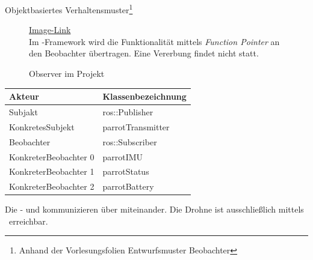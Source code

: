 
Objektbasiertes Verhaltensmuster\footnote{Anhand der Vorlesungsfolien \glq Entwurfsmuster Beobachter\grq}

\clearpage
{}
\begin{figure}[ht!]
\vspace{0.25cm}
\begin{center}
\caption{Observer im Projekt}
\label{fig:Obs}
\end{center}

\vspace{0.25cm}
\href{https://github.com/MaagMich/SWE2\_Project/blob/c5c3674bd201ee306463881cf711bb2ce9229842/Ausarbeitung/Pictures/Observer.png}{Image-Link}\\
Im \ROS-Framework wird die Funktionalität mittels \textit{Function Pointer} an den Beobachter übertragen. Eine Vererbung findet nicht statt.\\
\end{figure}


\FloatBarrier
{}
\begin{table}[!ht]
\begin{tabular}{ll}
Akteur				& Klassenbezeichnung \\ \hline
Subjakt				& ros::Publisher\\
KonkretesSubjekt		& parrotTransmitter\\
Beobachter			& ros::Subscriber\\
KonkreterBeobachter 0	& parrotIMU\\
KonkreterBeobachter 1	& parrotStatus\\
KonkreterBeobachter 2	& parrotBattery
\end{tabular}
\end{table}


\FloatBarrier
{}
Die \ROS-\Pub{} und \Sub{} kommunizieren über \Topic[s] miteinander.  Die Drohne ist ausschließlich mittels \ROS\ erreichbar.

